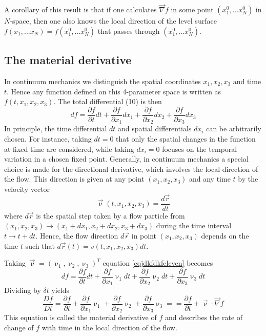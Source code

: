 A corollary of this result is that if one calculates $\vec\nabla f$ 
in some point $(x_1^0,...x_N^0)$ in $N$-space, then one also knows the local 
direction of the level surface $f(x_1,...x_N) = f(x_1^0,...x_N^0)$ 
that passes through $(x_1^0,...x_N^0)$.


\subsection{The material derivative}

In continuum mechanics we distinguish the spatial coordinates $x_1,x_2,x_3$ and time $t$. Hence
any function defined on this 4-parameter space is written as $f(t,x_1,x_2,x_3)$. The total
differential (10) is then
\begin{equation}
df=
\frac{\partial f}{\partial t} dt
+\frac{\partial f}{\partial x_1} dx_1
+\frac{\partial f}{\partial x_2} dx_2
+\frac{\partial f}{\partial x_3} dx_3
\label{eqjdkfdkfeleven}
\end{equation}
In principle, the time differential $dt$ and spatial differentials $dx_i$ 
can be arbitrarily chosen.
For instance, taking $dt=0$ that only the spatial changes in the function 
at fixed time are
considered, while taking $dx_i=0$ focuses on the temporal variation 
in a chosen fixed point.
Generally, in continuum mechanics a special choice is made for 
the directional derivative,
which involves the local direction of the flow. 
This direction is given at any point $(x_1,x_2,x_3)$
and any time $t$ by the velocity vector
\begin{equation}
\vec\upnu(t,x_1,x_2,x_3)=\frac{d\vec{r}}{dt}
\end{equation}
where $d\vec{r}$ is the spatial step taken by a flow particle 
from $(x_1,x_2,x_3)\rightarrow (x_1+dx_1,x_2+dx_2,x_3+dx_3)$ 
during the time interval $t \rightarrow t + dt$. 
Hence, the flow direction $d\vec{r}$ in point
$(x_1,x_2,x_3)$ depends on the time $t$ such that 
$d\vec{r}(t) = v(t,x_1,x_2,x_3)dt$.

Taking $\vec\upnu=(\upnu_1,\upnu_2,\upnu_3)^T$ equation \eqref{eqjdkfdkfeleven} 
becomes
\[
df=
\frac{\partial f}{\partial t} dt
+\frac{\partial f}{\partial x_1} \upnu_1 dt 
+\frac{\partial f}{\partial x_2} \upnu_2 dt 
+\frac{\partial f}{\partial x_3} \upnu_3 dt 
\]
Dividing by $\delta t$ yields
\[
\frac{Df}{Dt}
=\frac{\partial f}{\partial t} 
+\frac{\partial f}{\partial x_1} \upnu_1 
+\frac{\partial f}{\partial x_2} \upnu_2 
+\frac{\partial f}{\partial x_3} \upnu_3
= 
=\frac{\partial f}{\partial t} 
+\vec\upnu \cdot \vec\nabla f
\]
This equation is called the material derivative of $f$ 
and describes the rate of change of $f$ with time in the local direction of
the flow.





